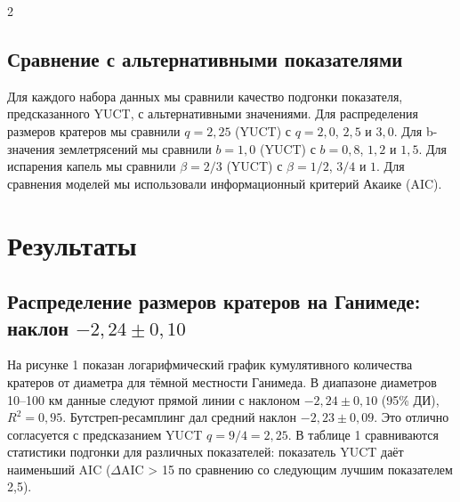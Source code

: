 \documentclass[11pt,a4paper]{article}
\begin{document}
\begin{multicols}{2}
		\subsection{Сравнение с альтернативными показателями}
		
		Для каждого набора данных мы сравнили качество подгонки показателя, предсказанного YUCT, с альтернативными значениями. Для распределения размеров кратеров мы сравнили \(q = 2,25\) (YUCT) с \(q = 2,0\), \(2,5\) и \(3,0\). Для b-значения землетрясений мы сравнили \(b = 1,0\) (YUCT) с \(b = 0,8\), \(1,2\) и \(1,5\). Для испарения капель мы сравнили \(\beta = 2/3\) (YUCT) с \(\beta = 1/2\), \(3/4\) и \(1\). Для сравнения моделей мы использовали информационный критерий Акаике (AIC).
		
		\section{Результаты}
		
		\subsection{Распределение размеров кратеров на Ганимеде: наклон \(-2,24 \pm 0,10\)}
		
		На рисунке 1 показан логарифмический график кумулятивного количества кратеров от диаметра для тёмной местности Ганимеда. В диапазоне диаметров 10–100 км данные следуют прямой линии с наклоном \(-2,24 \pm 0,10\) (95\% ДИ), \(R^2 = 0,95\). Бутстреп-ресамплинг дал средний наклон \(-2,23 \pm 0,09\). Это отлично согласуется с предсказанием YUCT \(q = 9/4 = 2,25\). В таблице 1 сравниваются статистики подгонки для различных показателей: показатель YUCT даёт наименьший AIC (\(\Delta\)AIC > 15 по сравнению со следующим лучшим показателем 2,5).
		

\end{multicols}
\end{document}
